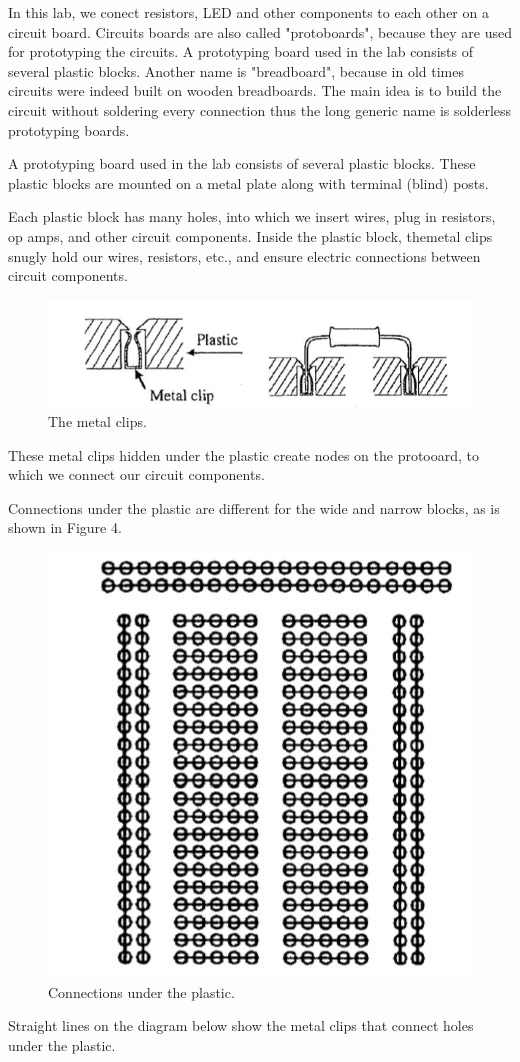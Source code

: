 \documentclass[a4paper]{report}
\begin{document}
	In this lab, we conect resistors, LED and other components to each other on a circuit board. Circuits boards are also called "protoboards", because they are used for prototyping the circuits. A prototyping board used in the lab consists of several plastic blocks. Another name is "breadboard", because in old times circuits were indeed built on wooden breadboards. The main idea is to build the circuit without soldering every connection thus the long generic name is solderless prototyping boards.
	
	A prototyping board used in the lab consists of several plastic blocks. These plastic blocks are mounted on a metal plate along with terminal (blind) posts.
	
	Each plastic block has many holes, into which we insert wires, plug in resistors, op amps, and other circuit components. Inside the plastic block, themetal clips snugly hold our wires, resistors, etc., and ensure electric connections between circuit components.
	\begin{figure}[H]
		\centering
		\includegraphics[width=0.8\linewidth]{3.jpg}
		\caption{The metal clips.}
	\end{figure}
	These metal clips hidden under the plastic create nodes on the protooard, to which we connect our circuit components.
	
	Connections under the plastic are different for the wide and narrow blocks, as is shown in Figure 4.
	\begin{figure}[H]
		\centering
		\includegraphics[width=0.8\linewidth]{4.jpg}
		\caption{Connections under the plastic.}
	\end{figure}
	Straight lines on the diagram below show the metal clips that connect holes under the plastic.
	
\end{document}
